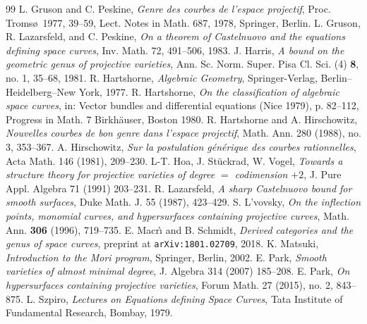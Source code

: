 \documentclass[a4, 11pt]{amsart}
\theoremstyle{plain}
\theoremstyle{definition}
\begin{document}
\begin{small}
\begin{thebibliography}{99}
 L. Gruson and C. Peskine, {\it Genre des courbes de l'espace projectif}, Proc. Troms\o \  1977, 39--59, Lect. Notes in
Math. 687, 1978, Springer, Berlin.
 L. Gruson, R. Lazarsfeld, and C. Peskine, {\it On a theorem of Castelnuovo and the equations defining space curves}, Inv. Math. 72, 491--506, 1983.
 J. Harris, {\it A bound on the geometric genus of projective varieties}, Ann. Sc. Norm. Super. Pisa Cl. Sci. (4) {\bf 8}, no. 1, 35--68, 1981. 
 R. Hartshorne, {\it Algebraic Geometry}, Springer-Verlag, Berlin--Heidelberg--New York, 1977.
 R. Hartshorne, {\it On the classification of algebraic space curves}, in: Vector bundles and differential equations (Nice 1979), p. 82--112, Progress in Math. 7 Birkh\"{a}user, Boston 1980.
 R. Hartshorne and A. Hirschowitz, {\it Nouvelles courbes de bon genre dans l'espace projectif},  Math. Ann. 280 (1988), no. 3, 353--367. 
 A. Hirschowitz, {\it Sur la postulation g\'{e}n\'{e}rique des courbes rationnelles}, Acta Math. 146 (1981),
209--230.
 L-T. Hoa, J. St\"{u}ckrad, W. Vogel, {\it Towards a structure theory for projective varieties of degree $=$ codimension $+ 2$}, J. Pure Appl. Algebra 71 (1991) 203--231.
 R. Lazarsfeld, {\it A sharp Castelnuovo bound for smooth surfaces}, Duke Math. J. 55 (1987), 423--429. 
 S. L'vovsky, {\it On the inflection points, monomial curves, and hypersurfaces containing projective curves}, Math. Ann. {\bf 306} (1996), 719--735. 
 E. Macr\`{\i} and B. Schmidt, {\it Derived categories and the genus of space curves}, preprint at \texttt{arXiv:1801.02709}, 2018. 
 K. Matsuki, {\it Introduction to the Mori program}, Springer, Berlin, 2002.
 E. Park, {\it Smooth varieties of almost minimal degree}, J. Algebra 314 (2007) 185--208.
 E. Park, {\it On hypersurfaces containing projective varieties}, Forum Math. 27 (2015), no. 2, 843--875.
 L. Szpiro, {\it Lectures on Equations defining Space Curves}, Tata Institute of Fundamental Research, Bombay, 1979.
\end{thebibliography}
\end{small}
\end{document}
